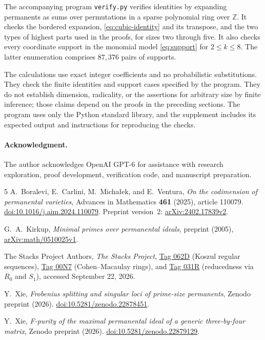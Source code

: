 \documentclass[11pt]{article}
\theoremstyle{remark}
\numberwithin{equation}{section}
\begin{document}
The accompanying program \texttt{verify.py} verifies identities by
expanding permanents as sums over permutations in a sparse polynomial
ring over $\mathbb Z$. It checks the bordered expansion,
\eqref{eq:cubic-identity} and its transpose, and the two types of
highest parts used in the proofs, for sizes two through five.
It also checks every coordinate support in the monomial model
\eqref{eq:support} for $2\leq k\leq8$.
The latter enumeration comprises $87{,}376$ pairs of supports.

The calculations use exact integer coefficients and no probabilistic
substitutions. They check the finite identities and support cases
specified by the program. They do not establish dimension, radicality,
or the assertions for arbitrary size by finite inference; those
claims depend on the proofs in the preceding sections. The program
uses only the Python standard library, and the supplement includes
its expected output and instructions for reproducing the checks.

\paragraph{Acknowledgment.}
The author acknowledges OpenAI GPT-6 for assistance with research
exploration, proof development, verification code, and manuscript
preparation.

\clearpage
\begin{thebibliography}{5}
A.~Boralevi, E.~Carlini, M.~Micha\l ek, and E.~Ventura,
\emph{On the codimension of permanental varieties},
Advances in Mathematics \textbf{461} (2025), article 110079.
\href{https://doi.org/10.1016/j.aim.2024.110079}{doi:10.1016/j.aim.2024.110079}.
Preprint version~2:
\href{https://arxiv.org/abs/2402.17839v2}{arXiv:2402.17839v2}.

G.~A.~Kirkup, \emph{Minimal primes over permanental ideals},
preprint (2005),
\href{https://arxiv.org/abs/math/0510025v1}{arXiv:math/0510025v1}.

The Stacks Project Authors, \emph{The Stacks Project},
\href{https://stacks.math.columbia.edu/tag/062D}{Tag 062D}
(Koszul regular sequences),
\href{https://stacks.math.columbia.edu/tag/00N7}{Tag 00N7}
(Cohen--Macaulay rings), and
\href{https://stacks.math.columbia.edu/tag/031R}{Tag 031R}
(reducedness via $R_0$ and $S_1$), accessed September 22, 2026.

Y.~Xie, \emph{Frobenius splitting and singular loci of prime-size
permanents}, Zenodo preprint (2026).
\href{https://doi.org/10.5281/zenodo.22878451}{doi:10.5281/zenodo.22878451}.

Y.~Xie, \emph{F-purity of the maximal permanental ideal of a generic
three-by-four matrix}, Zenodo preprint (2026).
\href{https://doi.org/10.5281/zenodo.22879129}{doi:10.5281/zenodo.22879129}.
\end{thebibliography}
\end{document}
